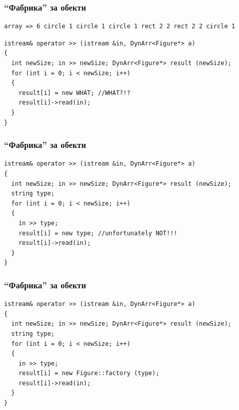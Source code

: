\documentclass{beamer}
\begin{document}
\begin{frame}[fragile]
\frametitle{``Фабрика'' за обекти}


\begin{flushleft}
\begin{lstlisting}
array => 6 circle 1 circle 1 circle 1 rect 2 2 rect 2 2 circle 1 
\end{lstlisting}  
\end{flushleft}

\begin{flushleft}
\begin{lstlisting}
istream& operator >> (istream &in, DynArr<Figure*> a)
{
  int newSize; in >> newSize; DynArr<Figure*> result (newSize);
  for (int i = 0; i < newSize; i++)
  {
    result[i] = new WHAT; //WHAT?!?
    result[i]->read(in);
  }
}
\end{lstlisting}  
\end{flushleft}


\end{frame}







\begin{frame}[fragile]
\frametitle{``Фабрика'' за обекти}


\begin{flushleft}
\begin{lstlisting}
istream& operator >> (istream &in, DynArr<Figure*> a)
{
  int newSize; in >> newSize; DynArr<Figure*> result (newSize);
  string type;
  for (int i = 0; i < newSize; i++)
  {
    in >> type;
    result[i] = new type; //unfortunately NOT!!!
    result[i]->read(in);
  }
}
\end{lstlisting}  
\end{flushleft}



\end{frame}

\begin{frame}[fragile]
\frametitle{``Фабрика'' за обекти}


\begin{flushleft}
\begin{lstlisting}
istream& operator >> (istream &in, DynArr<Figure*> a)
{
  int newSize; in >> newSize; DynArr<Figure*> result (newSize);
  string type;
  for (int i = 0; i < newSize; i++)
  {
    in >> type;
    result[i] = new Figure::factory (type); 
    result[i]->read(in);
  }
}
\end{lstlisting}  
\end{flushleft}


\end{frame}
\end{document}
